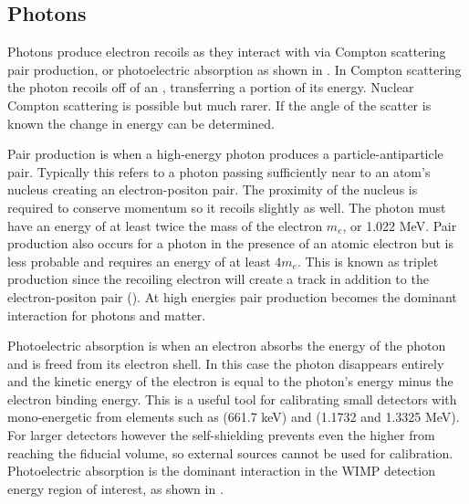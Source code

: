 \subsection{Photons}
\label{subsec:photons}
Photons produce electron recoils as they interact with \electron via Compton scattering pair production, or photoelectric absorption
as shown in .  In Compton scattering the photon
recoils off of an \electron, transferring a portion of its energy.  Nuclear Compton scattering is possible but much rarer.  If the
angle of the scatter is known the change in energy can be determined.

Pair production is when a high-energy photon produces a particle-antiparticle pair.  Typically this refers to a photon passing sufficiently
near to an atom's nucleus creating an electron-positon pair.  The proximity of the nucleus is required to conserve momentum so it
recoils slightly as well.  The photon must have an energy of at least twice the mass of the electron $m_{e}$, or 1.022 MeV.  Pair production
also occurs for a photon in the presence of an atomic electron but is less probable and requires an energy of at least $4m_{e}$.  This
is known as triplet production since the recoiling electron will create a track in addition to the electron-positon pair
().  At high energies pair production becomes the dominant interaction for photons and matter.

Photoelectric absorption is when an electron absorbs the energy of the photon and is freed from its electron shell.  In this case the
photon disappears entirely and the kinetic energy of the electron is equal to the photon's energy minus the electron binding energy.  This
is a useful tool for calibrating small detectors with mono-energetic \gammarays from elements such as \cesium (661.7 keV) and \cobaltsixty
(1.1732 and 1.3325 MeV).  For larger detectors however the self-shielding prevents even the higher \gammarays from reaching the fiducial
volume, so external sources cannot be used for calibration.  Photoelectric absorption is the dominant interaction in the WIMP detection
energy region of interest, as shown in .

